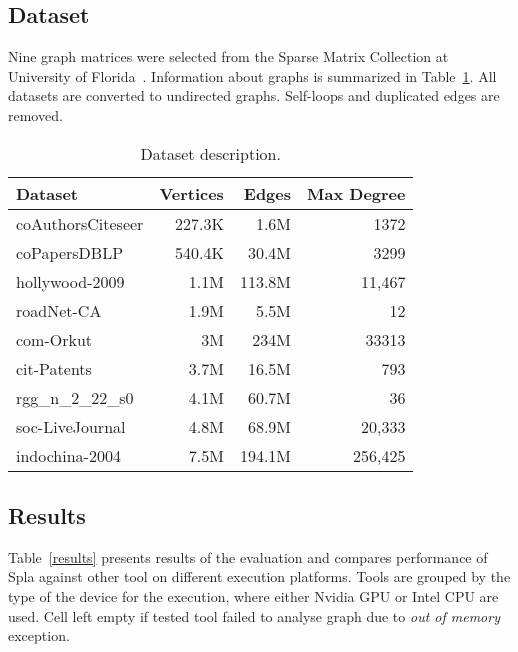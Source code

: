 \subsection{Dataset}

Nine graph matrices were selected from the Sparse Matrix Collection at University of Florida~\cite{dataset:10.1145/2049662.2049663}. 
Information about graphs is summarized in Table~\ref{dataset:info}. 
All datasets are converted to undirected graphs. 
Self-loops and duplicated edges are removed.

\begin{table}[htbp]
\caption{Dataset description.} 
\begin{center}
    \begin{tabular}{|l|r|r|r|}
    \hline
    Dataset & Vertices  & Edges & Max Degree \\
    \hline
    \hline
    coAuthorsCiteseer & 227.3K &   1.6M &    1372 \\
    coPapersDBLP      & 540.4K &  30.4M &    3299 \\
    hollywood-2009    &   1.1M & 113.8M &  11,467 \\
    roadNet-CA        &   1.9M &   5.5M &      12 \\
    com-Orkut         &     3M &   234M &   33313 \\
    cit-Patents       &   3.7M &  16.5M &     793 \\
    rgg\_n\_2\_22\_s0 &   4.1M &  60.7M &      36 \\
    soc-LiveJournal   &   4.8M &  68.9M &  20,333 \\
    indochina-2004    &   7.5M & 194.1M & 256,425 \\
    \hline
    \end{tabular}
    \label{dataset:info}
\end{center}
\end{table}

\subsection{Results}

Table~\ref{results} presents results of the evaluation and compares performance of Spla against other tool on different execution platforms.
Tools are grouped by the type of the device for the execution, where either Nvidia GPU or Intel CPU are used. 
Cell left empty if tested tool failed to analyse graph due to \textit{out of memory} exception.

